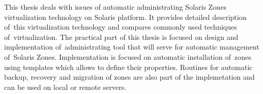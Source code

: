 This thesis deals with issues of automatic administrating Solaris Zones virtualization technology on Solaris platform.
It provides detailed description of~this virtualization technology and compares commonly used techniques of~virtualization.
The practical part of this thesis is focused on design and implementation of~administrating tool that will serve for automatic
management of~Solaris Zones. Implementation is focused on automatic installation of~zones using templates which allows to define
their properties. Routines for automatic backup, recovery and migration of zones are also part of the implemetation and can be
used on local or remote servers.
